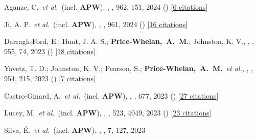 \item[{\color{deemph}\scriptsize122}]Aganze, C.~\textit{et al.}~(incl. \textbf{APW}), , \apj, 962, 151, 2024 () [\href{http://adsabs.harvard.edu/abs/2024ApJ...962..151A}{6 citations}]

\item[{\color{deemph}\scriptsize121}]Ji, A. P.~\textit{et al.}~(incl. \textbf{APW}), , \apj, 961, 2024 () [\href{http://adsabs.harvard.edu/abs/2024ApJ...961L..41J}{16 citations}]

\item[{\color{deemph}\scriptsize120}]Darragh-Ford, E.; Hunt, J. A. S.; \textbf{Price-Whelan,~A.~M.}; Johnston, K. V., , \apj, 955, 74, 2023 () [\href{http://adsabs.harvard.edu/abs/2023ApJ...955...74D}{18 citations}]

\item[{\color{deemph}\scriptsize119}]Yavetz, T. D.; Johnston, K. V.; Pearson, S.; \textbf{Price-Whelan,~A.~M.}~\textit{et al.}, , \apj, 954, 215, 2023 () [\href{http://adsabs.harvard.edu/abs/2023ApJ...954..215Y}{7 citations}]

\item[{\color{deemph}\scriptsize118}]Castro-Ginard, A.~\textit{et al.}~(incl. \textbf{APW}), , \aanda, 677, 2023 () [\href{http://adsabs.harvard.edu/abs/2023A&A...677A..37C}{27 citations}]

\item[{\color{deemph}\scriptsize117}]Lucey, M.~\textit{et al.}~(incl. \textbf{APW}), , \mnras, 523, 4049, 2023 () [\href{http://adsabs.harvard.edu/abs/2023MNRAS.523.4049L}{23 citations}]

\item[{\color{deemph}\scriptsize116}]Silva, {\'E}.~\textit{et al.}~(incl. \textbf{APW}), , \rnaas, 7, 127, 2023

